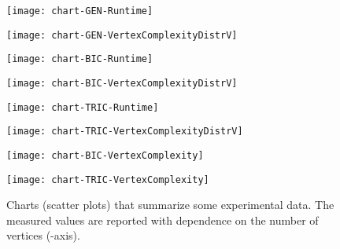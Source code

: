 \documentclass{article}
\begin{document}
 
\begin{figure}[t!]
    \centering
    \begin{minipage}[b]{.49\textwidth}
    	\centering
    	\texttt{[image: chart-GEN-Runtime]}
    	\label{ch:chart-GEN-Runtime}
    \end{minipage}
    \begin{minipage}[b]{.49\textwidth}
    	\centering
    	\texttt{[image: chart-GEN-VertexComplexityDistrV]}
    	\label{ch:chart-GEN-VertexComplexityDistrV}
    \end{minipage}    
    \begin{minipage}[b]{.49\textwidth}
    	\centering
    	\texttt{[image: chart-BIC-Runtime]}
    	\label{ch:chart-BIC-Runtime}
    \end{minipage}
   \begin{minipage}[b]{.49\textwidth}
    	\texttt{[image: chart-BIC-VertexComplexityDistrV]}
    	\label{ch:chart-BIC-VertexComplexityDistrV}
    \end{minipage}     
    \begin{minipage}[b]{.49\textwidth}
    	\centering
    	\texttt{[image: chart-TRIC-Runtime]}
    	\label{ch:chart-TRIC-Runtime}
    \end{minipage}
    \begin{minipage}[b]{.49\textwidth}
    	\texttt{[image: chart-TRIC-VertexComplexityDistrV]}
    	\label{ch:chart-TRIC-VertexComplexityDistrV}
    \end{minipage}
     \begin{minipage}[b]{.49\textwidth}
    	\centering
    	\texttt{[image: chart-BIC-VertexComplexity]}
    	\label{ch:chart-BIC-VertexComplexity}
    \end{minipage}
    \begin{minipage}[b]{.49\textwidth}
    	\centering
    	\texttt{[image: chart-TRIC-VertexComplexity]}
    	\label{ch:chart-TRIC-VertexComplexity}
    \end{minipage}        
    \caption{Charts (scatter plots) that summarize some experimental data. The measured values are reported with dependence on the number of vertices (-axis).}\label{ch:all}
\end{figure}   
\end{document}
